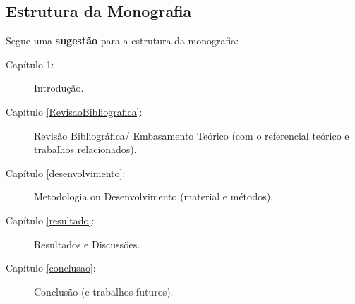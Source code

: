 \subsection{Estrutura da Monografia}

Segue uma \textbf{sugestão} para a estrutura da monografia: 

\begin{description}
   \item[Capítulo 1:] Introdução.
   \item[Capítulo \ref{RevisaoBibliografica}:] Revisão Bibliográfica/ Embasamento Teórico (com o referencial teórico e trabalhos relacionados).
   \item[Capítulo \ref{desenvolvimento}:] Metodologia ou Desenvolvimento (material e métodos).
   \item[Capítulo \ref{resultado}:] Resultados e Discussões.
   \item[Capítulo \ref{conclusao}:] Conclusão (e trabalhos futuros).
\end{description}


 









